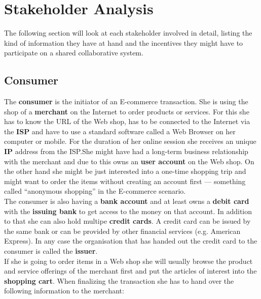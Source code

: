 
\section{Stakeholder Analysis}
\label{sec:stakeholder_analysis}

The following section will look at each stakeholder involved in detail, listing the kind of information they have at hand and the incentives they might have to participate on a shared collaborative system.

\subsection{Consumer}
\label{subsec:stakeholder_consumer}

The \textbf{consumer} is the initiator of an E-commerce transaction. She is using the shop of a \textbf{merchant} on the Internet to order products or services. For this she has to know the \gls{URL} of the Web shop, has to be connected to the Internet via the \textbf{\gls{ISP}} and have to use a standard software called a Web Browser on her computer or mobile. For the duration of her online session she receives an unique \textbf{\gls{IP}} address from the ISP.\@ She might have had a long-term business relationship with the merchant and due to this owns an \textbf{user account} on the Web shop. On the other hand she might be just interested into a one-time shopping trip and might want to order the items without creating an account first --- something called ``anonymous shopping'' in the E-commerce scenario. \\

The consumer is also having a \textbf{bank account} and at least owns a \textbf{debit card} with the \textbf{issuing bank} to get access to the money on that account. In addition to that she can also hold multipe \textbf{credit cards}. A credit card can be issued by the same bank or can be provided by other financial services (e.g. American Express). In any case the organisation that has handed out the credit card to the consumer is called the \textbf{issuer}. \\

If she is going to order items in a Web shop she will usually browse the product and service offerings of the merchant first and put the articles of interest into the \textbf{shopping cart}. When finalizing the transaction she has to hand over the following information to the merchant:\@


